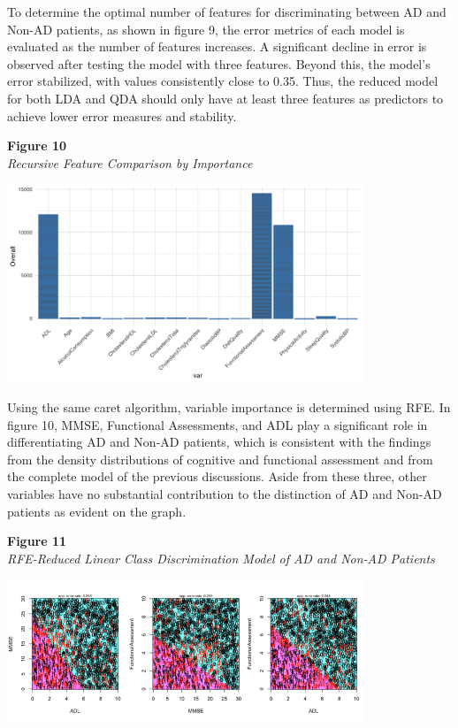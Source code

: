 \documentclass[12pt]{article}
\begin{document}
To determine the optimal number of features for discriminating between AD and Non-AD patients, as shown in figure 9, the error metrics of each model is evaluated as the number of features increases. A significant decline in error is observed after testing the model with three features. Beyond this, the model's error
stabilized, with values consistently close to 0.35. Thus, the reduced model for both LDA and QDA should only have at least three features as predictors to achieve lower error measures and stability. 

\noindent
\textbf{Figure 10} \\
\textit{Recursive Feature Comparison by Importance}
\begin{center}
    \includegraphics[width = 0.8\textwidth]{RFE Feature Selection.png}
\end{center}

Using the same caret algorithm, variable importance is determined using RFE. In figure 10, MMSE, Functional Assessments, and ADL play a significant role in differentiating AD and Non-AD patients, which is consistent with the findings from the density distributions of cognitive and functional assessment and from the complete model of the previous 
discussions. Aside from these three, other variables have no substantial contribution to the distinction of AD and Non-AD patients as evident on the graph. 

\noindent
\textbf{Figure 11} \\
\textit{RFE-Reduced Linear Class Discrimination Model of AD and Non-AD Patients}
\begin{center}
    \includegraphics[width = 0.8\textwidth]{LDA_RFE.png}
\end{center}
\end{document}
